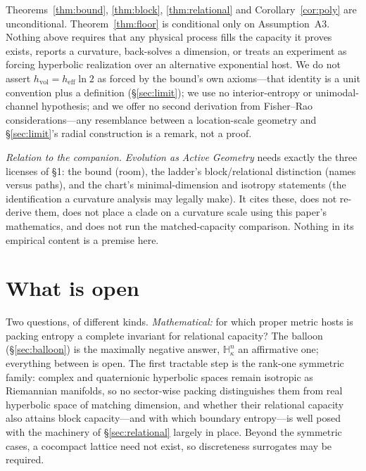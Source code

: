 \documentclass[11pt,reqno]{amsart}
\theoremstyle{plain}
\theoremstyle{definition}
\newcommand{\hvol}{h_{\mathrm{vol}}}
\newcommand{\heff}{h_{\mathrm{eff}}}
\newcommand{\Hk}{\mathbb{H}^n_\kappa}
\begin{document}
Theorems~\ref{thm:bound}, \ref{thm:block}, \ref{thm:relational} and Corollary~\ref{cor:poly} are unconditional. Theorem~\ref{thm:floor} is conditional only on Assumption~A3. Nothing above requires that any physical process fills the capacity it proves exists, reports a curvature, back-solves a dimension, or treats an experiment as forcing hyperbolic realization over an alternative exponential host. We do not assert $\hvol=\heff\ln2$ as forced by the bound's own axioms---that identity is a unit convention plus a definition (\S\ref{sec:limit}); we use no interior-entropy or unimodal-channel hypothesis; and we offer no second derivation from Fisher--Rao considerations---any resemblance between a location-scale geometry and \S\ref{sec:limit}'s radial construction is a remark, not a proof.

\emph{Relation to the companion.} \emph{Evolution as Active Geometry} needs exactly the three licenses of \S1: the bound (room), the ladder's block/relational distinction (names versus paths), and the chart's minimal-dimension and isotropy statements (the identification a curvature analysis may legally make). It cites these, does not re-derive them, does not place a clade on a curvature scale using this paper's mathematics, and does not run the matched-capacity comparison. Nothing in its empirical content is a premise here.

\section{What is open}\label{sec:open}

Two questions, of different kinds. \emph{Mathematical:} for which proper metric hosts is packing entropy a complete invariant for relational capacity? The balloon (\S\ref{sec:balloon}) is the maximally negative answer, $\Hk$ an affirmative one; everything between is open. The first tractable step is the rank-one symmetric family: complex and quaternionic hyperbolic spaces remain isotropic as Riemannian manifolds, so no sector-wise packing distinguishes them from real hyperbolic space of matching dimension, and whether their relational capacity also attains block capacity---and with which boundary entropy---is well posed with the machinery of \S\ref{sec:relational} largely in place. Beyond the symmetric cases, a cocompact lattice need not exist, so discreteness surrogates may be required.
\end{document}
